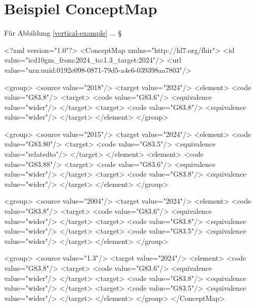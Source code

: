 \section{Beispiel ConceptMap}
\label{conceptmap-example}

Für Abbildung \ref{vertical-example} ... § \\

\begin{Code}
<?xml version="1.0"?>
<ConceptMap xmlns="http://hl7.org/fhir">
  <id value="icd10gm_from:2024_to:1.3_target:2024"/>
  <url value="urn:uuid:0192e098-0871-79d5-a4e6-039398aa7803"/>

<group>
  <source value="2018"/>
  <target value="2024"/>
  <element>
    <code value="G83.8"/>
    <target>
      <code value="G83.6"/>
      <equivalence value="wider"/>
    </target>
    <target>
      <code value="G83.8"/>
      <equivalence value="wider"/>
    </target>
  </element>
</group>

<group>
  <source value="2015"/>
  <target value="2024"/>
  <element>
    <code value="G83.80"/>
    <target>
      <code value="G83.5"/>
      <equivalence value="relatedto"/>
    </target>
  </element>
  <element>
    <code value="G83.88"/>
    <target>
      <code value="G83.6"/>
      <equivalence value="wider"/>
    </target>
    <target>
      <code value="G83.8"/>
      <equivalence value="wider"/>
    </target>
  </element>
</group>

<group>
  <source value="2004"/>
  <target value="2024"/>
  <element>
    <code value="G83.8"/>
    <target>
      <code value="G83.6"/>
      <equivalence value="wider"/>
    </target>
    <target>
      <code value="G83.8"/>
      <equivalence value="wider"/>
    </target>
    <target>
      <code value="G83.5"/>
      <equivalence value="wider"/>
    </target>
  </element>
</group>

<group>
  <source value="1.3"/>
  <target value="2024"/>
  <element>
    <code value="G83.8"/>
    <target>
      <code value="G83.6"/>
      <equivalence value="wider"/>
    </target>
    <target>
      <code value="G83.8"/>
      <equivalence value="wider"/>
    </target>
    <target>
      <code value="G83.5"/>
      <equivalence value="wider"/>
    </target>
  </element>
</group>
</ConceptMap>
\end{Code}
